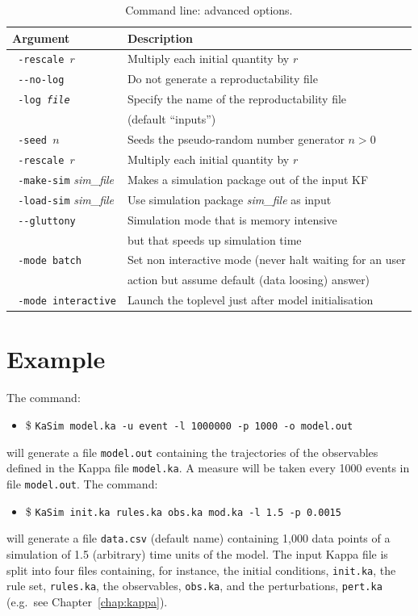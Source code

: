 \documentclass[11pt]{book}
\def\ttt#1{\texttt{#1}}
\def\eg{e.g.~}
\def\ITE#1{\begin{itemize}#1\end{itemize}}
\def\dd{-\hspace{0.001cm}-}
\begin{document}
\begin{table}[h!]
\caption{Command line: advanced options.}
\centering
\begin{tabular}{|l|l|}
\hline
Argument & Description \\ \hline
\ttt{ -rescale $r$} & Multiply each initial quantity by $r$ \\
\ttt{ \dd no-log} & Do not generate a reproductability file \\
\ttt{ -log \textit{file}} & Specify the name of the reproductability file \\
& (default ``inputs'') \\
\ttt{ -seed $n$} & Seeds the pseudo-random number generator $n>0$ \\
\ttt{ -rescale $r$} & Multiply each initial quantity by $r$ \\
\ttt{ -make-sim} \textit{sim\_file} & Makes a simulation package out of the input KF\index{Kappa file} \\
\ttt{ -load-sim} \textit{sim\_file} & Use simulation package \textit{sim\_file} as input\\
\ttt{ \dd gluttony} & Simulation mode that is memory intensive \\ & but that speeds up simulation time\\
\ttt{ -mode batch} & Set non interactive mode (never halt waiting for an user\\
& action but assume default (data loosing) answer)\\
\ttt{ -mode interactive} & Launch the toplevel just after model initialisation\\
\hline
\end{tabular}
\label{tab:add-options}
\end{table}%
%

\section{Example}
The command:
\ITE{
\item[\$] \ttt{KaSim model.ka -u event -l 1000000 -p 1000 -o model.out}
}
will generate a file \ttt{model.out} containing the trajectories of the observables defined in the Kappa file \ttt{model.ka}. A measure will be taken every 1000 events in file \ttt{model.out}. The command:
\ITE{
\item[\$] \ttt{KaSim init.ka rules.ka obs.ka mod.ka -l 1.5 -p 0.0015}
}
will generate a file \ttt{data.csv} (default name) containing 1,000 data points of a simulation of 1.5 (arbitrary) time units of the model. The input Kappa file is split into four files containing, for instance, the initial conditions, \ttt{init.ka}, the rule set, \ttt{rules.ka}, the observables, \ttt{obs.ka}, and the perturbations, \ttt{pert.ka} ({\eg}see Chapter~\ref{chap:kappa}). %
\end{document}
